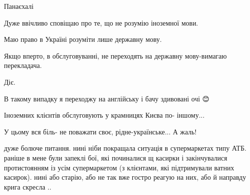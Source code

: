 \begin{itemize}
 
Панаєхалі

 

Дуже ввічливо сповіщаю про те, що не розумію іноземної мови.

Маю право в Україні розуміти лише державну мову.

Якщо вперто, в обслуговуванні, не переходять на державну мову-вимагаю
перекладача.

Діє.

 

В такому випадку я переходжу на англійську і бачу здивовані очі 😊

Іноземних клієнтів обслуговують у крамницях Києва по- іншому...

У цьому вся біль- не поважати своє, рідне-українське... А жаль!

 

дуже болюче питання. нині ніби покращала ситуація в супермаркетах типу АТБ.
раніше в мене були запеклі бої, які починалися щ касирки і закінчувалися
протистоянням із усім супермаркетом (з клієнтами, які підтримували ватних
касирок). нині або старію, або не так вже гостро реагую на них, або й направду
крига скресла ..


 

\end{itemize}
